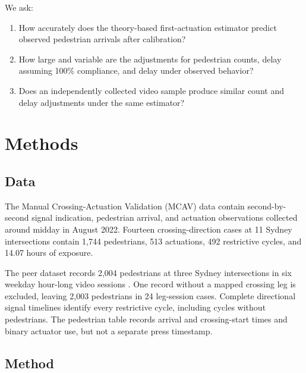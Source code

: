 \documentclass[11pt]{article}
\begin{document}
We ask:
\begin{enumerate}
  \item How accurately does the theory-based first-actuation estimator predict observed pedestrian arrivals after calibration?
  \item How large and variable are the adjustments for pedestrian counts, delay assuming 100\% compliance, and delay under observed behavior?
  \item Does an independently collected video sample produce similar count and delay adjustments under the same estimator?
\end{enumerate}

\section{Methods}

\subsection{Data}

The Manual Crossing-Actuation Validation (MCAV) data contain second-by-second signal indication, pedestrian arrival, and actuation observations collected around midday in August 2022. Fourteen crossing-direction cases at 11 Sydney intersections contain 1,744 pedestrians, 513 actuations, 492 restrictive cycles, and 14.07 hours of exposure.

The peer dataset records 2,004 pedestrians at three Sydney intersections in six weekday hour-long video sessions \citep{choy2026pedestrianNonCompliance}. One record without a mapped crossing leg is excluded, leaving 2,003 pedestrians in 24 leg-session cases. Complete directional signal timelines identify every restrictive cycle, including cycles without pedestrians. The pedestrian table records arrival and crossing-start times and binary actuator use, but not a separate press timestamp.

\subsection{Method}
\end{document}
